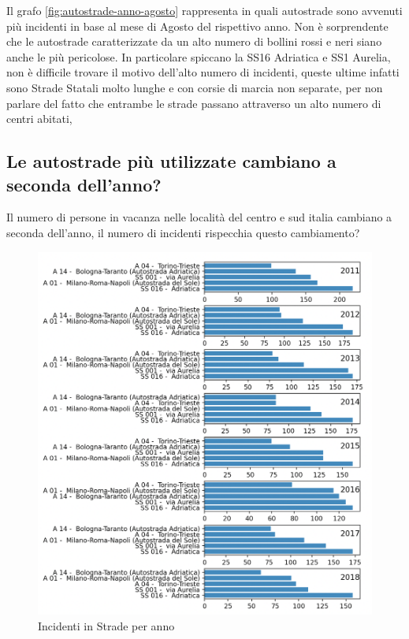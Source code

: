 \documentclass[a4paper]{report}
\begin{document}
Il grafo \ref{fig:autostrade-anno-agosto} rappresenta in quali autostrade sono avvenuti più incidenti in base al mese di Agosto
del rispettivo anno.
Non è sorprendente che le autostrade caratterizzate da un alto numero di bollini rossi e neri 
siano anche le più pericolose.
In particolare spiccano la SS16 Adriatica e SS1 Aurelia, non è difficile trovare il motivo dell'alto numero di incidenti, 
queste ultime infatti sono Strade Statali molto lunghe e con corsie di marcia non separate, 
per non parlare del fatto che entrambe le strade passano attraverso un alto numero di centri abitati, 

\subsection{Le autostrade più utilizzate cambiano a seconda dell'anno?}

Il numero di persone in vacanza nelle località del centro e sud italia cambiano 
a seconda dell'anno, il numero di incidenti rispecchia questo cambiamento?

\begin{figure}
    \includegraphics[width=\linewidth]{../src/incidenti/incidenti_aci/agosto/autostrade.png}
    \caption{Incidenti in Strade per anno}
    \label{fig:autostrade-anno}
\end{figure}
\end{document}
